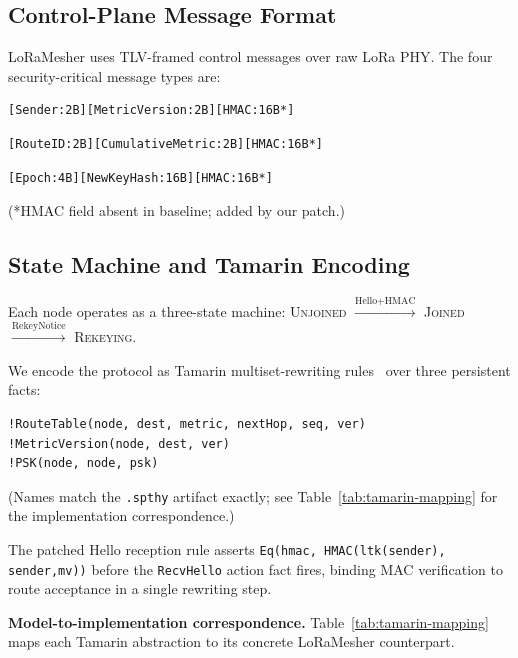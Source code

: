 \documentclass[preprint,12pt]{elsarticle}
\begin{document}
\subsection{Control-Plane Message Format}

LoRaMesher uses TLV-framed control messages over raw LoRa PHY.
The four security-critical message types are:

\begin{lstlisting}[caption={Hello (Type=0x00) — broadcast every 10s}]
[Sender:2B][MetricVersion:2B][HMAC:16B*]
\end{lstlisting}
\begin{lstlisting}[caption={RouteReply (Type=0x02) — unicast route response}]
[RouteID:2B][CumulativeMetric:2B][HMAC:16B*]
\end{lstlisting}
\begin{lstlisting}[caption={RekeyNotice (Type=0x03) — session rekeying}]
[Epoch:4B][NewKeyHash:16B][HMAC:16B*]
\end{lstlisting}

\noindent(*HMAC field absent in baseline; added by our patch.)

\subsection{State Machine and Tamarin Encoding}

Each node operates as a three-state machine:
\textsc{Unjoined} $\xrightarrow{\text{Hello+HMAC}}$ \textsc{Joined}
$\xrightarrow{\text{RekeyNotice}}$ \textsc{Rekeying}.

We encode the protocol as Tamarin multiset-rewriting rules~\cite{basin2025-tamarin-book}
over three persistent facts:
\begin{lstlisting}
!RouteTable(node, dest, metric, nextHop, seq, ver)
!MetricVersion(node, dest, ver)
!PSK(node, node, psk)
\end{lstlisting}
\noindent(Names match the \texttt{.spthy} artifact exactly; see Table~\ref{tab:tamarin-mapping} for the implementation correspondence.)

The patched Hello reception rule asserts \texttt{Eq(hmac, HMAC(ltk(sender), \textlangle sender,mv\textrangle))} before the \texttt{RecvHello} action fact fires, binding MAC verification to route acceptance in a single rewriting step.

\textbf{Model-to-implementation correspondence.}
Table~\ref{tab:tamarin-mapping} maps each Tamarin abstraction to its
concrete LoRaMesher counterpart.
\end{document}
